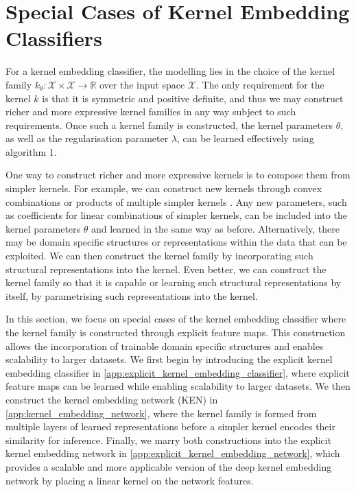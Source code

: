 \documentclass{article}
\numberwithin{equation}{section}
\numberwithin{table}{section}
\numberwithin{algorithm}{section}
\begin{document}
\newpage
\section{Special Cases of Kernel Embedding Classifiers}
\label{app:special_cases}

	For a kernel embedding classifier, the modelling lies in the choice of the kernel family $k_{\theta} : \mathcal{X} \times \mathcal{X} \to \mathbb{R}$ over the input space $\mathcal{X}$. The only requirement for the kernel $k$ is that it is symmetric and positive definite, and thus we may construct richer and more expressive kernel families in any way subject to such requirements. Once such a kernel family is constructed, the kernel parameters $\theta$, as well as the regularisation parameter $\lambda$, can be learned effectively using algorithm 1.
	
	One way to construct richer and more expressive kernels is to compose them from simpler kernels. For example, we can construct new kernels through convex combinations or products of multiple simpler kernels \citep{genton2001classes}. Any new parameters, such as coefficients for linear combinations of simpler kernels, can be included into the kernel parameters $\theta$ and learned in the same way as before. Alternatively, there may be domain specific structures or representations within the data that can be exploited. We can then construct the kernel family by incorporating such structural representations into the kernel. Even better, we can construct the kernel family so that it is capable or learning such structural representations by itself, by parametrising such representations into the kernel.
	
	In this section, we focus on special cases of the kernel embedding classifier where the kernel family is constructed through explicit feature maps. This construction allows the incorporation of trainable domain specific structures and enables scalability to larger datasets. We first begin by introducing the explicit kernel embedding classifier in \cref{app:explicit_kernel_embedding_classifier}, where explicit feature maps can be learned while enabling scalability to larger datasets. We then construct the kernel embedding network (KEN) in \cref{app:kernel_embedding_network}, where the kernel family is formed from multiple layers of learned representations before a simpler kernel encodes their similarity for inference. Finally, we marry both constructions into the explicit kernel embedding network in \cref{app:explicit_kernel_embedding_network}, which provides a scalable and more applicable version of the deep kernel embedding network by placing a linear kernel on the network features.
\end{document}
